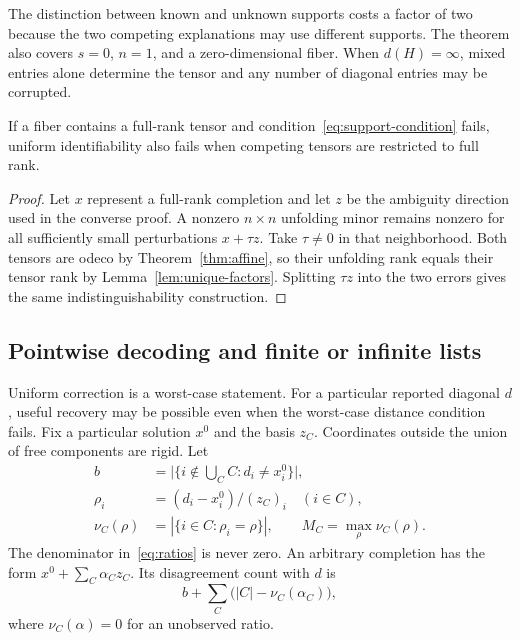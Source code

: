 The distinction between known and unknown supports costs a factor of two because the two competing explanations may use different supports. The theorem also covers $s=0$, $n=1$, and a zero-dimensional fiber. When $d(H)=\infty$, mixed entries alone determine the tensor and any number of diagonal entries may be corrupted.

\begin{corollary}\label{cor:fullrank}
If a fiber contains a full-rank tensor and condition~\eqref{eq:support-condition} fails, uniform identifiability also fails when competing tensors are restricted to full rank.
\end{corollary}
\begin{proof}
Let $x$ represent a full-rank completion and let $z$ be the ambiguity direction used in the converse proof. A nonzero $n\times n$ unfolding minor remains nonzero for all sufficiently small perturbations $x+\tau z$. Take $\tau\ne0$ in that neighborhood. Both tensors are odeco by Theorem~\ref{thm:affine}, so their unfolding rank equals their tensor rank by Lemma~\ref{lem:unique-factors}. Splitting $\tau z$ into the two errors gives the same indistinguishability construction.
\end{proof}

\subsection{Pointwise decoding and finite or infinite lists}
Uniform correction is a worst-case statement. For a particular reported diagonal $d$, useful recovery may be possible even when the worst-case distance condition fails. Fix a particular solution $x^0$ and the basis $z_C$. Coordinates outside the union of free components are rigid. Let
\begin{align}
 b&=\big|\{i\notin\bigcup_C C:d_i\ne x^0_i\}\big|,\label{eq:rigid-errors}\\
 \rho_i&=(d_i-x^0_i)/(z_C)_i\quad(i\in C),\label{eq:ratios}\\
 \nu_C(\rho)&=|\{i\in C:\rho_i=\rho\}|,\qquad
 M_C=\max_\rho\nu_C(\rho).\label{eq:frequency}
\end{align}
The denominator in~\eqref{eq:ratios} is never zero. An arbitrary completion has the form $x^0+\sum_C\alpha_Cz_C$. Its disagreement count with $d$ is
\begin{equation}\label{eq:disagreement}
 b+\sum_C\big(|C|-\nu_C(\alpha_C)\big),
\end{equation}
where $\nu_C(\alpha)=0$ for an unobserved ratio.

